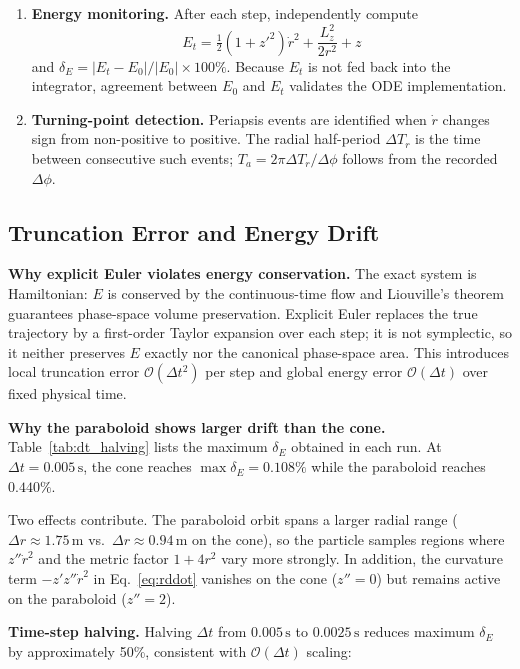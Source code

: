 \documentclass[11pt,letterpaper]{article}
\newcommand{\parhead}[1]{\par\medskip\noindent\textbf{#1}\ignorespaces}
\begin{document}
\begin{enumerate}[leftmargin=2em, itemsep=0.7em, topsep=0.5em, label=\textbf{\arabic*.}]
    \item \textbf{Energy monitoring.}
    After each step, independently compute
    \begin{equation*}
        E_t = \tfrac{1}{2}(1+z'^2)\dot{r}^2 + \frac{L_z^2}{2r^2} + z
    \end{equation*}
    and $\delta_E=|E_t-E_0|/|E_0|\times 100\%$. Because $E_t$ is not fed back into the integrator, agreement between $E_0$ and $E_t$ validates the ODE implementation.

    \item \textbf{Turning-point detection.}
    Periapsis events are identified when $\dot{r}$ changes sign from non-positive to positive. The radial half-period $\Delta T_r$ is the time between consecutive such events; $T_a=2\pi\Delta T_r/\Delta\phi$ follows from the recorded $\Delta\phi$.
\end{enumerate}

\subsection{Truncation Error and Energy Drift}
\label{sec:error}

\parhead{Why explicit Euler violates energy conservation.}
The exact system is Hamiltonian: $E$ is conserved by the continuous-time flow and Liouville's theorem guarantees phase-space volume preservation. Explicit Euler replaces the true trajectory by a first-order Taylor expansion over each step; it is not symplectic, so it neither preserves $E$ exactly nor the canonical phase-space area. This introduces local truncation error $\mathcal{O}(\Delta t^2)$ per step and global energy error $\mathcal{O}(\Delta t)$ over fixed physical time.

\parhead{Why the paraboloid shows larger drift than the cone.}
Table~\ref{tab:dt_halving} lists the maximum $\delta_E$ obtained in each run. At $\Delta t=0.005\,\mathrm{s}$, the cone reaches $\max\delta_E=0.108\%$ while the paraboloid reaches $0.440\%$.

Two effects contribute. The paraboloid orbit spans a larger radial range ($\Delta r\approx 1.75\,\mathrm{m}$ vs.\ $\Delta r\approx 0.94\,\mathrm{m}$ on the cone), so the particle samples regions where $z''\dot{r}^2$ and the metric factor $1+4r^2$ vary more strongly. In addition, the curvature term $-z'z''\dot{r}^2$ in Eq.~\eqref{eq:rddot} vanishes on the cone ($z''=0$) but remains active on the paraboloid ($z''=2$).

\parhead{Time-step halving.}
Halving $\Delta t$ from $0.005\,\mathrm{s}$ to $0.0025\,\mathrm{s}$ reduces maximum $\delta_E$ by approximately 50\%, consistent with $\mathcal{O}(\Delta t)$ scaling:
\end{document}
